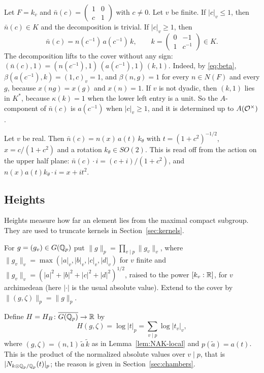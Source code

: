\begin{example}\label{ex:nak-local}
Let $F=k_v$ and $\bar n(c)=\begin{pmatrix}1&0\\c&1\end{pmatrix}$ with
$c\ne0$. Let $v$ be finite. If $|c|_v\le1$, then $\bar n(c)\in K$ and the
decomposition is trivial. If $|c|_v\ge1$, then
\[
\bar n(c)=n(c^{-1})\,a(c^{-1})\,k,\qquad
k=\begin{pmatrix}0&-1\\1&c^{-1}\end{pmatrix}\in K .
\]
The decomposition lifts to the cover without any sign:
$(\bar n(c),1)=(n(c^{-1}),1)\,(a(c^{-1}),1)\,(k,1)$. Indeed, by
\eqref{eq:beta}, $\beta(a(c^{-1}),k)=(1,c)_v=1$, and $\beta(n,g)=1$ for
every $n\in N(F)$ and every $g$, because $x(ng)=x(g)$ and $x(n)=1$. If $v$
is not dyadic, then $(k,1)$ lies in $K^*$, because $\kappa(k)=1$ when
the lower left entry is a unit. So the $A$-component of $\bar n(c)$ is
$a(c^{-1})$ when $|c|_v\ge1$, and it is determined up to $A(\mathcal{O}^\times)$.

Let $v$ be real. Then $\bar n(c)=n(x)\,a(t)\,k_\theta$ with
$t=(1+c^2)^{-1/2}$, $x=c/(1+c^2)$ and a rotation $k_\theta\in SO(2)$. This
is read off from the action on the upper half plane:
$\bar n(c)\cdot i=(c+i)/(1+c^2)$, and $n(x)a(t)k_\theta\cdot i=x+it^2$.
\end{example}

\subsection{Heights}

Heights measure how far an element lies from the maximal compact
subgroup. They are used to truncate kernels in Section~\ref{sec:kernels}.


For $g=(g_v)\in G(\mathbb{Q}_p)$ put $\|g\|_p=\prod_{v\mid p}\|g_v\|_v$, where
$\|g_v\|_v=\max(|a|_v,|b|_v,|c|_v,|d|_v)$ for $v$ finite and
$\|g_v\|_v=(|a|^2+|b|^2+|c|^2+|d|^2)^{1/2}$, raised to the power
$[k_v:\mathbb{R}]$, for $v$ archimedean (here $|\cdot|$ is the usual absolute
value). Extend to the cover by $\|(g,\zeta)\|_p=\|g\|_p$.

Define $H=H_B\colon\overline{G(\mathbb{Q}_p)}\to\mathbb{R}$ by
\begin{equation}\label{eq:H}
H(g,\zeta)=\log|t|_p=\sum_{v\mid p}\log|t_v|_v,
\end{equation}
where $(g,\zeta)=(n,1)\,\tilde a\,\tilde k$ as in
Lemma~\ref{lem:NAK-local} and $p(\tilde a)=a(t)$. This is the product
of the normalized absolute values over $v\mid p$, that is
$|N_{k\otimes\mathbb{Q}_p/\mathbb{Q}_p}(t)|_p$; the reason is given in
Section~\ref{sec:chambers}.

